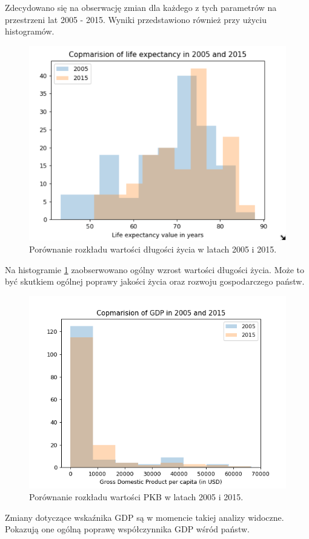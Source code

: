 \documentclass{article}
\begin{document}
\clearpage
Zdecydowano się na obserwację zmian dla każdego z tych parametrów na przestrzeni lat 2005 - 2015. Wyniki przedstawiono również przy użyciu histogramów.

\begin{figure}[h!]
\begin{center}
\includegraphics[width=3 in]{Pictures/2_LE_2005_vs_2015.png}
\end{center}
\captionsetup{justification=centering}
\caption{Porównanie rozkładu wartości długości życia w latach 2005 i 2015.}
\label{fig:2_LE_2005_2015}
\end{figure}

Na histogramie \ref{fig:2_LE_2005_2015} zaobserwowano ogólny wzrost wartości długości życia.
Może to być skutkiem ogólnej poprawy jakości życia oraz rozwoju gospodarczego państw.


\begin{figure}[h!]
\begin{center}
\includegraphics[width=3 in]{Pictures/3_GDP_2005_vs_2015.png}
\end{center}
\captionsetup{justification=centering}
\caption{Porównanie rozkładu wartości PKB w latach 2005 i 2015.}
\label{fig:3_PKB_2005_2015}
\end{figure}

Zmiany dotyczące wskaźnika GDP są w momencie takiej analizy widoczne.
Pokazują one ogólną poprawę współczynnika GDP wśród państw.
\end{document}
